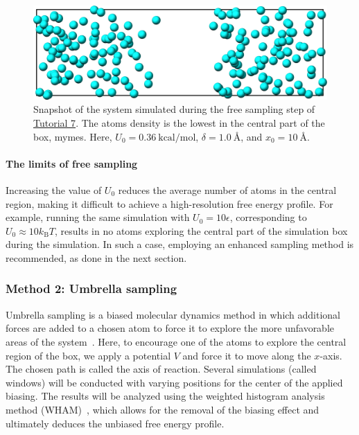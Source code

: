 \documentclass[9pt,tutorial]{livecoms}
\newcommand{\lmpcmd}[1]{\colorbox{listing}{\textcolor{command}{\small{#1}}}} %
\begin{document}
\begin{figure}
\centering
\includegraphics[width=\linewidth]{US-system-unbiased}
\caption{Snapshot of the system simulated during the free sampling
step of \hyperref[umbrella-sampling-label]{Tutorial 7}.
The atoms density is the lowest in the central
part of the box, \lmpcmd{mymes}.  Here,
$U_0 = 0.36~\text{kcal/mol}$, $\delta = 1.0~\text{\AA{}}$, and $x_0 = 10~\text{\AA{}}$.}
\label{fig:US-system-unbiased}
\end{figure}

\paragraph{The limits of free sampling}

Increasing the value of $U_0$ reduces the average number of atoms in the central
region, making it difficult to achieve a high-resolution free energy profile.
For example, running the same simulation with $U_0 = 10 \epsilon$,
corresponding to $U_0 \approx 10 k_\text{B} T$, results in no atoms exploring
the central part of the simulation box during the simulation.
In such a case, employing an enhanced sampling method is recommended, as done in the next section.

\subsubsection{Method 2: Umbrella sampling}

Umbrella sampling is a biased molecular dynamics method in which
additional forces are added to a chosen atom to force it to explore the
more unfavorable areas of the system~\cite{kastner2011umbrella,
  allen2017computer, frenkel2023understanding}.  Here, to encourage one
of the atoms to explore the central region of the box, we apply a
potential $V$ and force it to move along the $x$-axis. The chosen path
is called the axis of reaction. Several simulations (called windows)
will be conducted with varying positions for the center of the applied
biasing. The results will be analyzed using the weighted histogram
analysis method (WHAM)~\cite{kumar1992weighted,kumar1995multidim}, which
allows for the removal of the biasing effect and ultimately deduces the
unbiased free energy profile.
\end{document}
